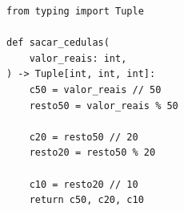 \ifmostrarGabarito
\begin{verbatim}
from typing import Tuple

def sacar_cedulas(
    valor_reais: int,
) -> Tuple[int, int, int]:
    c50 = valor_reais // 50
    resto50 = valor_reais % 50
    
    c20 = resto50 // 20
    resto20 = resto50 % 20
    
    c10 = resto20 // 10
    return c50, c20, c10
\end{verbatim}

\fi
